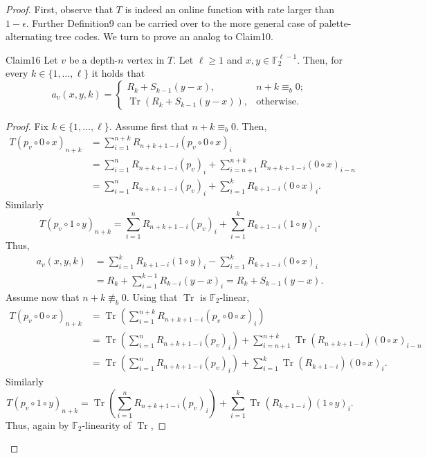 \begin{proof}
First, observe that $T$ is indeed an online function with rate larger than $1-\epsilon$. Further Definition9 can be carried over to the more general case of palette-alternating tree codes. We turn to prove an analog to Claim10.
\begin{authorclaim}{Claim16}
Let $v$ be a depth-$n$ vertex in $T$. Let $\ell\ge1$ and $x,y\in\mathbb F_2^{\ell-1}$. Then, for every $k\in\{1,\ldots,\ell\}$ it holds that
\[
a_v(x,y,k)=\begin{cases}R_k+S_{k-1}(y-x),&n+k\equiv_b0;\\
\operatorname{Tr}(R_k+S_{k-1}(y-x)),&\text{otherwise}.\end{cases}
\]
\end{authorclaim}
\begin{proof}
Fix $k\in\{1,\ldots,\ell\}$. Assume first that $n+k\equiv_b0$. Then,
\begin{align*}
T(p_v\circ0\circ x)_{n+k}
&=\sum_{i=1}^{n+k}R_{n+k+1-i}(p_v\circ0\circ x)_i\\
&=\sum_{i=1}^nR_{n+k+1-i}(p_v)_i
+\sum_{i=n+1}^{n+k}R_{n+k+1-i}(0\circ x)_{i-n}\\
&=\sum_{i=1}^nR_{n+k+1-i}(p_v)_i
+\sum_{i=1}^kR_{k+1-i}(0\circ x)_i.
\end{align*}
Similarly
\[
T(p_v\circ1\circ y)_{n+k}
=\sum_{i=1}^nR_{n+k+1-i}(p_v)_i+\sum_{i=1}^kR_{k+1-i}(1\circ y)_i.
\]
Thus,
\begin{align*}
a_v(x,y,k)
&=\sum_{i=1}^kR_{k+1-i}(1\circ y)_i-\sum_{i=1}^kR_{k+1-i}(0\circ x)_i\\
&=R_k+\sum_{i=1}^{k-1}R_{k-i}(y-x)_i=R_k+S_{k-1}(y-x).
\end{align*}
Assume now that $n+k\not\equiv_b0$. Using that $\operatorname{Tr}$ is $\mathbb F_2$-linear,
\begin{align*}
T(p_v\circ0\circ x)_{n+k}
&=\operatorname{Tr}\left(\sum_{i=1}^{n+k}R_{n+k+1-i}(p_v\circ0\circ x)_i\right)\\
&=\operatorname{Tr}\left(\sum_{i=1}^nR_{n+k+1-i}(p_v)_i\right)
+\sum_{i=n+1}^{n+k}\operatorname{Tr}(R_{n+k+1-i})(0\circ x)_{i-n}\\
&=\operatorname{Tr}\left(\sum_{i=1}^nR_{n+k+1-i}(p_v)_i\right)
+\sum_{i=1}^k\operatorname{Tr}(R_{k+1-i})(0\circ x)_i.
\end{align*}
Similarly
\[
T(p_v\circ1\circ y)_{n+k}
=\operatorname{Tr}\left(\sum_{i=1}^nR_{n+k+1-i}(p_v)_i\right)
+\sum_{i=1}^k\operatorname{Tr}(R_{k+1-i})(1\circ y)_i.
\]
Thus, again by $\mathbb F_2$-linearity of $\operatorname{Tr}$,

\end{proof}
\end{proof}
